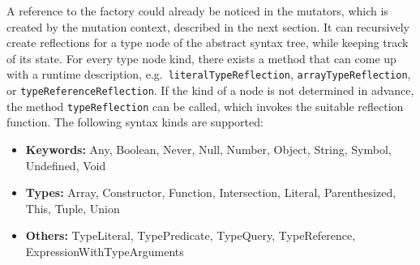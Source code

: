 A reference to the factory could already be noticed in the mutators, which is created by the mutation context, described in the next section. It can recursively create reflections for a type node of the abstract syntax tree, while keeping track of its state. For every type node kind, there exists a method that can come up with a runtime description, e.g.\ \texttt{literalTypeReflection}, \texttt{arrayTypeReflection}, or \texttt{typeReferenceReflection}. If the kind of a node is not determined in advance, the method \texttt{typeReflection} can be called, which invokes the suitable reflection function. The following syntax kinds are supported:
\begin{itemize}
  \item \textbf{Keywords:} Any, Boolean, Never, Null, Number, Object, String, Symbol, Undefined, Void
  \item \textbf{Types:} Array, Constructor, Function, Intersection, Literal, Parenthesized, This, Tuple, Union
  \item \textbf{Others:} TypeLiteral, TypePredicate, TypeQuery, TypeReference, ExpressionWithTypeArguments
\end{itemize}

